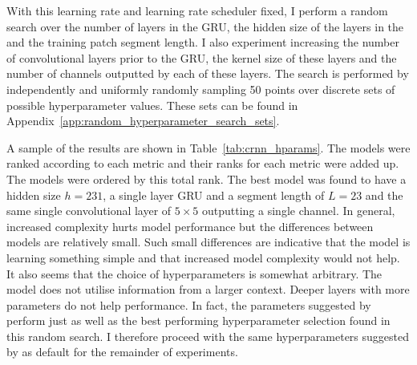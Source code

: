 With this learning rate and learning rate scheduler fixed, I perform a random search over the number of layers in the GRU, the hidden size of the layers in the and the training patch segment length. I also experiment increasing the number of convolutional layers prior to the GRU, the kernel size of these layers
and the number of channels outputted by each of these layers. The search is performed by independently and uniformly randomly sampling 50 points over discrete sets of possible hyperparameter values. These sets can be found in Appendix~\ref{app:random_hyperparameter_search_sets}. 

A sample of the results are shown in Table~\ref{tab:crnn_hparams}. The models were ranked according to each metric and their ranks for each metric were added up. The models were ordered by this total rank. The best model was found to have a hidden size $h=231$, a single layer GRU and a segment length of $L=23$ and the same single convolutional layer of $5\times 5$ outputting a single channel. In general, increased complexity hurts model performance but the differences between models are relatively small. Such small differences are indicative that the model is learning something simple and that increased model complexity would not help. It also seems that the choice of hyperparameters is somewhat arbitrary. The model does not utilise information from a larger context. Deeper layers with more parameters do not help performance. In fact, the parameters suggested by \citet{StructuredTraining} perform just as well as the best performing hyperparameter selection found in this random search. I therefore proceed with the same hyperparameters suggested by \citet{StructuredTraining} as default for the remainder of experiments.

